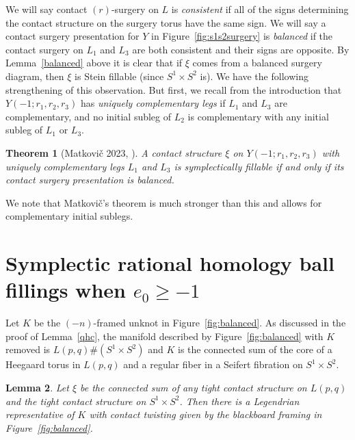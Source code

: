 \documentclass[11pt]{amsart}
\theoremstyle{plain}
\newtheorem{theorem}{Theorem}
\newtheorem{lemma}[theorem]{Lemma}
\theoremstyle{definition}
\theoremstyle{remark}
\numberwithin{theorem}{section}
\newcommand{\dfn}[1]{{\em #1}}        %
\begin{document}
We will say contact $(r)$-surgery on $L$ is \dfn{consistent} if all of the signs determining the contact structure on the surgery torus have the same sign. We will say a contact surgery presentation for $Y$ in Figure~\ref{fig:s1s2surgery} is \dfn{balanced} if the contact surgery on $L_1$ and $L_3$ are both consistent and their signs are opposite. By Lemma~\ref{balanced} above it is clear that if $\xi$ comes from a balanced surgery diagram, then $\xi$ is Stein fillable (since $S^1\times S^2$ is). We have the following strengthening of this observation. But first, we recall from the introduction that $Y(-1;r_1,r_2,r_3)$ has \dfn{uniquely complementary legs} if $L_1$ and $L_3$ are complementary, and no initial subleg of $L_2$ is complementary with any initial subleg of $L_1$ or $L_3$. 

\begin{theorem}[Matkovi\v c 2023, \cite{Matkovic23}]\label{thmMatkovic}
A contact structure $\xi$ on $Y(-1;r_1,r_2,r_3)$ with uniquely complementary legs $L_1$ and $L_3$ is symplectically fillable if and only if its contact surgery presentation is balanced. 
\end{theorem}
We note that Matkovi\v c's theorem is much stronger than this and allows for complementary initial sublegs. 


\section{Symplectic rational homology ball fillings when $e_0 \geq -1$} \label{eogeqm1}

Let $K$ be the $(-n)$-framed unknot in Figure~\ref{fig:balanced}. As discussed in the proof of Lemma~\ref{qhc}, the manifold described by Figure~\ref{fig:balanced} with $K$ removed is $L(p,q)\# (S^1\times S^2)$ and $K$ is the connected sum of the core of a Heegaard torus in $L(p,q)$ and a regular fiber in a Seifert fibration on $S^1\times S^2$.

\begin{lemma}\label{maxtb}
Let $\xi$ be the connected sum of any tight contact structure on $L(p,q)$ and the tight contact structure on $S^1\times S^2$. Then there is a Legendrian representative of $K$ with contact twisting given by the blackboard framing in Figure~\ref{fig:balanced}.
\end{lemma}
\end{document}
